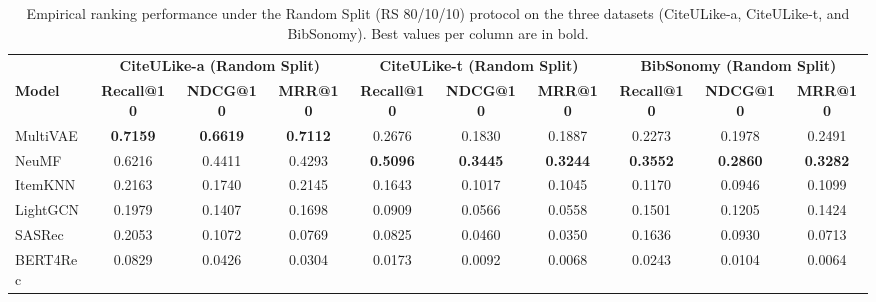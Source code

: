 \documentclass[journal]{IEEEtran}
\makeatletter
\newcommand{\at}[1]{@#1}
\makeatother
\begin{document}
\begin{table}[t]
\centering
\caption{Empirical ranking performance under the Random Split (RS 80/10/10) protocol on the three datasets (CiteULike-a, CiteULike-t, and BibSonomy). Best values per column are in bold.}
\label{tab:results-rs}
\footnotesize
\setlength{\tabcolsep}{3.5pt}
\begin{tabular}{lccccccccc}
\toprule
& \multicolumn{3}{c}{\textbf{CiteULike-a (Random Split)}} & \multicolumn{3}{c}{\textbf{CiteULike-t (Random Split)}} & \multicolumn{3}{c}{\textbf{BibSonomy (Random Split)}} \\
\cmidrule(lr){2-4} \cmidrule(lr){5-7} \cmidrule(lr){8-10}
\textbf{Model} & \textbf{Recall\at{10}} & \textbf{NDCG\at{10}} & \textbf{MRR\at{10}} & \textbf{Recall\at{10}} & \textbf{NDCG\at{10}} & \textbf{MRR\at{10}} & \textbf{Recall\at{10}} & \textbf{NDCG\at{10}} & \textbf{MRR\at{10}} \\
\midrule
MultiVAE & \textbf{0.7159} & \textbf{0.6619} & \textbf{0.7112} & 0.2676 & 0.1830 & 0.1887 & 0.2273 & 0.1978 & 0.2491 \\
NeuMF    & 0.6216 & 0.4411 & 0.4293 & \textbf{0.5096} & \textbf{0.3445} & \textbf{0.3244} & \textbf{0.3552} & \textbf{0.2860} & \textbf{0.3282} \\
ItemKNN  & 0.2163 & 0.1740 & 0.2145 & 0.1643 & 0.1017 & 0.1045 & 0.1170 & 0.0946 & 0.1099 \\
LightGCN & 0.1979 & 0.1407 & 0.1698 & 0.0909 & 0.0566 & 0.0558 & 0.1501 & 0.1205 & 0.1424 \\
SASRec   & 0.2053 & 0.1072 & 0.0769 & 0.0825 & 0.0460 & 0.0350 & 0.1636 & 0.0930 & 0.0713 \\
BERT4Rec & 0.0829 & 0.0426 & 0.0304 & 0.0173 & 0.0092 & 0.0068 & 0.0243 & 0.0104 & 0.0064 \\
\bottomrule
\end{tabular}
\end{table}
\end{document}
